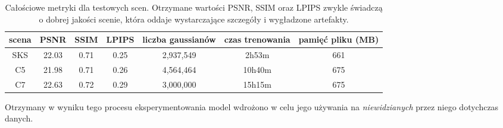\begin{table}[!h]
    \centering
    \begin{tabular}{|c|c|c|c|c|c|c|}
    \hline
    scena & PSNR & SSIM & LPIPS & liczba gaussianów & czas trenowania & pamięć pliku (MB) \\
    \hline 
    SKS & 22.03 & 0.71 & 0.25 & 2,937,549 & 2h53m & 661 \\
    \hline 
    C5 & 21.98 & 0.71 & 0.26 & 4,564,464 & 10h40m & 675 \\
    \hline 
    C7 & 22.63 & 0.72 & 0.29 & 3,000,000 & 15h15m & 675 \\
    \hline
    \end{tabular}
\caption{Całościowe metryki dla testowych scen. Otrzymane wartości PSNR, SSIM oraz LPIPS zwykle świadczą o dobrej jakości scenie, która oddaje wystarczające szczegóły i wygładzone artefakty.}
\label{table:tab_seg_met}
\end{table}

Otrzymany w wyniku tego procesu eksperymentowania model wdrożono w celu jego używania na \textit{niewidzianych} przez niego dotychczas danych.